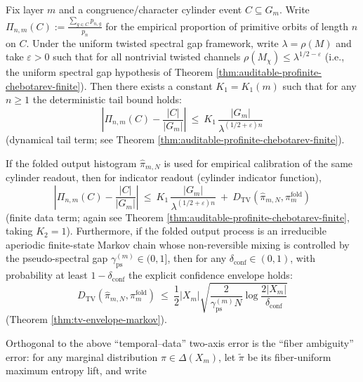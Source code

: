 \begin{theorem}\label{thm:prefix-readout-orthogonal-error-decomposition}
Fix layer \(m\) and a congruence/character cylinder event \(C\subseteq G_m\).
Write \(\Pi_{n,m}(C):=\frac{\sum_{g\in C}p_{n,g}}{p_n}\) for the empirical proportion of primitive orbits of length \(n\) on \(C\).
Under the uniform twisted spectral gap framework, write \(\lambda=\rho(M)\) and take \(\varepsilon>0\) such that for all nontrivial twisted channels \(\rho(M_\chi)\le \lambda^{1/2-\varepsilon}\) (i.e., the uniform spectral gap hypothesis of Theorem \ref{thm:auditable-profinite-chebotarev-finite}).
Then there exists a constant \(K_1=K_1(m)\) such that for any \(n\ge 1\) the deterministic tail bound holds:
\begin{equation}\label{eq:prefix-tail-term}
\boxed{\;
\left|\Pi_{n,m}(C)-\frac{|C|}{|G_m|}\right|
\ \le\
K_1\,\frac{|G_m|}{\lambda^{(1/2+\varepsilon)n}}\;}
\end{equation}
(dynamical tail term; see Theorem \ref{thm:auditable-profinite-chebotarev-finite}).
\par
If the folded output histogram \(\hat{\pi}_{m,N}\) is used for empirical calibration of the same cylinder readout, then for indicator readout (cylinder indicator function),
\begin{equation}\label{eq:prefix-tail-plus-data}
\boxed{\;
\left|\Pi_{n,m}(C)-\frac{|C|}{|G_m|}\right|
\ \le\
K_1\,\frac{|G_m|}{\lambda^{(1/2+\varepsilon)n}}
\ +\
D_{\mathrm{TV}}(\hat{\pi}_{m,N},\pi_m^{\mathrm{fold}})\;}
\end{equation}
(finite data term; again see Theorem \ref{thm:auditable-profinite-chebotarev-finite}, taking \(K_2=1\)).
Furthermore, if the folded output process is an irreducible aperiodic finite-state Markov chain whose non-reversible mixing is controlled by the pseudo-spectral gap \(\gamma_{\mathrm{ps}}^{(m)}\in(0,1]\), then for any \(\delta_{\mathrm{conf}}\in(0,1)\), with probability at least \(1-\delta_{\mathrm{conf}}\) the explicit confidence envelope holds:
\begin{equation}\label{eq:prefix-data-envelope}
\boxed{\;
D_{\mathrm{TV}}(\hat{\pi}_{m,N},\pi_m^{\mathrm{fold}})
\ \le\
\frac12|X_m|\sqrt{\frac{2}{\gamma_{\mathrm{ps}}^{(m)}N}\log\frac{2|X_m|}{\delta_{\mathrm{conf}}}}\;}
\end{equation}
(Theorem \ref{thm:tv-envelope-markov}).
\par
Orthogonal to the above ``temporal--data'' two-axis error is the ``fiber ambiguity'' error: for any marginal distribution \(\pi\in\Delta(X_m)\), let \(\widetilde\pi\) be its fiber-uniform maximum entropy lift, and write

\end{theorem}
